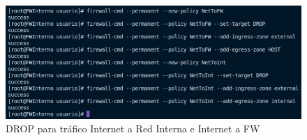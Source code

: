 \documentclass[11pt]{report}
\begin{document}
\begin{itemize}
  \begin{figure}[H]
    \centering
    \includegraphics[scale=0.58]{img/drop_net_to_network.png}
    \caption{DROP para tráfico Internet a Red Interna e Internet a FW}
  \end{figure}

\end{itemize}

\cleardoublepage
\end{document}
